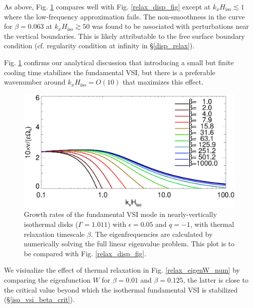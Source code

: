 As above, Fig. \ref{relax_growth_num} compares well with
Fig. \ref{relax_disp_fig} except at $k_xH_\mathrm{iso}\lesssim 1$
where the low-frequency approximation fails. The non-smoothness in the
curve for $\beta=0.063$ at $k_xH_\mathrm{iso}\gtrsim50$ was found to be
associated with perturbations near the vertical boundaries. This is
likely attributable to the free surface boundary condition 
(cf. regularity condition at infinity in \S\ref{disp_relax}). 

Fig. \ref{relax_growth_num} confirms our analytical discussion that
introducing a small but finite cooling time stabilizes the fundamental
VSI, but there is a preferable wavenumber around $k_xH_\mathrm{iso} =
O(10)$ that maximizes this effect. 

\begin{figure}
  \includegraphics[width=\linewidth,clip=true,trim=0cm 0cm 0cm 1cm]{figures/compare_eigen_imag_bloop2}
  \caption{Growth rates of the fundamental VSI mode in
    nearly-vertically isothermal disks ($\Gamma=1.011$) with
    $\epsilon=0.05$ and $q=-1$, with thermal relaxation timescale
    $\beta$. The eigenfrequencies are calculated by numerically
    solving the full linear eigenvalue problem. This plot is to
    be compared with Fig. \ref{relax_disp_fig}. \label{relax_growth_num}}   
\end{figure}   

We visiualize the effect of thermal relaxation in
Fig. \ref{relax_eigenW_num} by comparing the eigenfunction $W$ for
$\beta=0.01$ and $\beta=0.125$, the latter is close to the critical
value beyond which the isothermal fundamental VSI is stabilized
(\S\ref{iso_vsi_beta_crit}).  




